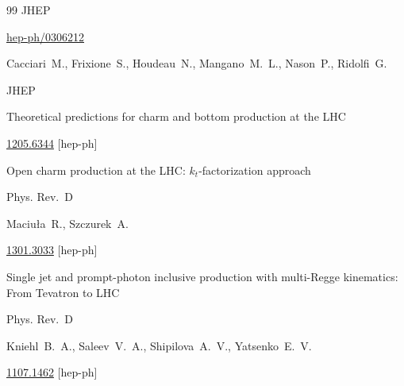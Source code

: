 \begin{thebibliography}{99}
\jour  JHEP 

\arxiv \href{http://arxiv.org/abs/hep-ph/0306212}{hep-ph/0306212}






\by Cacciari~M., Frixione~S., Houdeau~N., Mangano~M.~L., Nason~P., Ridolfi~G.

\jour JHEP 

\paper Theoretical predictions for charm and bottom production at the LHC






\arxiv \href{http://arxiv.org/abs/1205.6344}{1205.6344} [hep-ph]






\paper Open charm production at the LHC: $k_{t}$-factorization approach


\jour Phys. Rev.~D 




\by Maciu{\l}a~R., Szczurek~A.


\arxiv \href{http://arxiv.org/abs/1301.3033}{1301.3033} [hep-ph]




\paper Single jet and prompt-photon inclusive production with multi-Regge kinematics: From Tevatron to LHC


\jour Phys. Rev.~D 



\by Kniehl~B.~A., Saleev~V.~A.,  Shipilova~A.~V.,  Yatsenko~E.~V.



\arxiv \href{http://arxiv.org/abs/1107.1462}{1107.1462} [hep-ph]




\end{thebibliography}
